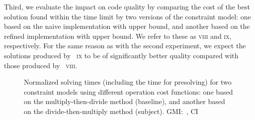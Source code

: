 \def\modelH{\textsc{viii}}
\def\modelI{\textsc{ix}}

Third, we evaluate the impact on code quality by comparing the cost of the best
\gls{solution} found within the time limit by two versions of the
\gls{constraint model}: one based on the naive implementation with upper bound,
and another based on the refined implementation with upper bound.
%
We refer to these  as \modelH{} and \modelI,
respectively.
%
For the same reason as with the second experiment, we expect the
\glspl{solution} produced by ~\modelI{} to be of
significantly better quality compared with those produced by
~\modelH.



\begin{figure}
  \centering%
  \maxsizebox{\textwidth}{!}{%
    \trimBarchartPlot{%
    }%
  }

  \caption[%
            Plot for evaluating the operation cost function's impact on
            solving time%
          ]%
          {%
            Normalized solving times (including the time for presolving) for two
            constraint models using different operation cost functions: one
            based on the multiply-then-divide method (baseline), and another
            based on the divide-then-multiply method (subject).
            GMI:~\printGMI{%
              \NewOpCostFunVsOldPrePlusSolvingTimeSpeedupPrePlusSolvingTimeRegularSpeedupGmean%
            },
            CI~\printGMICI{%
              \NewOpCostFunVsOldPrePlusSolvingTimeSpeedupPrePlusSolvingTimeRegularSpeedupCiMin%
            }{%
              \NewOpCostFunVsOldPrePlusSolvingTimeSpeedupPrePlusSolvingTimeRegularSpeedupCiMax%
            }%
          }
\end{figure}

